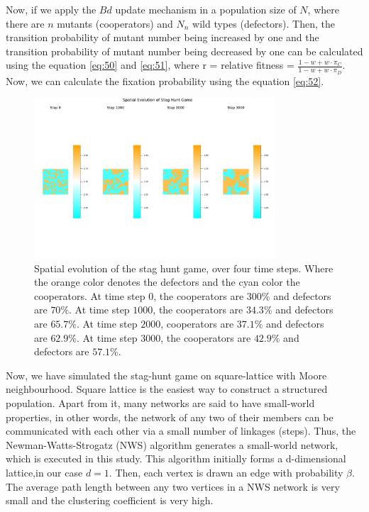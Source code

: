 \documentclass{article}
\begin{document}
Now, if we apply the $Bd$ update mechanism in a population size of $N$, where there are $n$ mutants (cooperators) and $N_n$ wild types (defectors). Then, the transition probability of mutant number being increased by one and the transition probability of mutant number being decreased by one can be calculated using the equation \eqref{eq:50} and \eqref{eq:51}, where r = relative fitness = $\frac{1 - w + w \cdot \pi_C}{1 - w + w \cdot \pi_D}$. Now, we can calculate the fixation probability using the equation \eqref{eq:52}.
\begin{figure}[H]
    \centering
    \includegraphics[width=0.8\textwidth]{SH_SP.pdf}
    \caption{Spatial evolution of the stag hunt game, over four time steps. Where the orange color denotes the defectors and the cyan color the cooperators.
    At time step $0$, the cooperators are $300\%$ and defectors are $70\%$. 
    At time step $1000$, the cooperators are $34.3\%$ and defectors are $65.7\%$. 
    At time step $2000$, cooperators are $37.1\%$ and defectors are $62.9\%$. 
    At time step $3000$, the cooperators are $42.9\%$ and defectors are $57.1\%$.}
    \label{fig:6}
\end{figure}
Now, we have simulated the stag-hunt game on square-lattice with Moore neighbourhood. Square lattice is the easiest way to construct a structured population. Apart from it, many networks are said to have small-world properties, in other words, the network of any two of their members can be communicated with each other via a small number of linkages (steps). Thus, the Newman-Watts-Strogatz (NWS) algorithm generates a small-world network, which is executed in this study. This algorithm initially forms a d-dimensional lattice,in our case $d=1$.  Then, each vertex is drawn an edge with probability $\beta$.  The average path length between any two vertices in a NWS network is very small and the clustering coefficient is very high.
\end{document}

